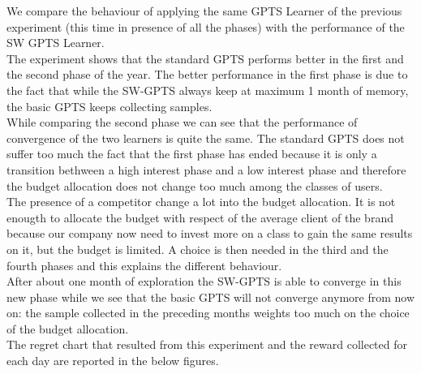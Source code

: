 We compare the behaviour of applying the same GPTS Learner of the previous experiment (this time in presence of all the phases) with the performance of the SW GPTS Learner.
\\The experiment shows that the standard GPTS performs better in the first and the second phase of the year.  The better performance in the first phase is due to the fact that while the SW-GPTS always keep at maximum 1 month of memory, the basic GPTS keeps collecting samples. 
\\While comparing the second phase we can see that the performance of convergence of the two learners is quite the same. The standard GPTS does not suffer too much the fact that the first phase has ended because it is only a transition bethween a high interest phase and a low interest phase and therefore the budget allocation does not change too much among the classes of users.
\\The presence of a competitor change a lot into the budget allocation. It is not enougth to allocate the budget with respect of the average client of the brand because our company now need to invest more on a class to gain the same results on it, but the budget is limited. A choice is then needed in the third and the fourth phases and this explains the different behaviour. 
\\After about one month of exploration the SW-GPTS is able to converge in this new phase while we see that the basic GPTS will not converge anymore from now on: the sample collected in the preceding months weights too much on the choice of the budget allocation.
\\The regret chart that resulted from this experiment and the reward collected for each day are reported in the below figures.\\
\newpage
{}